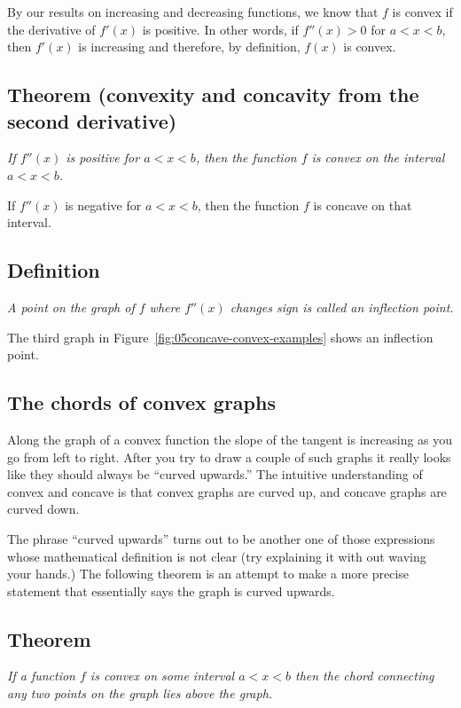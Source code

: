 By our results on increasing and decreasing functions, we know that $f$ is
convex if the derivative of $f'(x)$ is positive. In other words, if $f''(x)>0$
for $a<x<b$, then $f'(x)$ is increasing and therefore, by definition, $f(x)$ is
convex.


\subsection{Theorem (convexity and concavity from the second derivative)} %
\itshape If $f''(x)$ is positive for $a<x<b$, then the function $f$ is convex on
the interval $a<x<b$.

If $f''(x)$ is negative for $a<x<b$, then the function $f$ is concave on that
interval.\upshape\smallskip



\subsection{Definition} %
\itshape%
A point on the graph of $f$ where $f''(x)$ changes sign is called an
\emph{inflection point}.\upshape\smallskip

The third graph in Figure~\ref{fig:05concave-convex-examples} shows an inflection
point.

\subsection{The chords of convex graphs} %
Along the graph of a convex function the slope of the tangent is increasing as
you go from left to right.  After you try to draw a couple of such graphs it
really looks like they should always be ``curved upwards.''   The intuitive
understanding of convex and concave is that convex graphs are curved up, and
concave graphs are curved down.

The phrase ``curved upwards'' turns out to be another one of those expressions
whose mathematical definition is not clear (try explaining it with out waving
your hands.)  The following theorem is an attempt to make a more precise
statement that essentially says the graph is curved upwards.

\subsection*{Theorem} %
\itshape If a function $f$ is convex on some interval
$a<x<b$ then the chord connecting any two points on the graph lies
above the graph.  \upshape\smallskip


